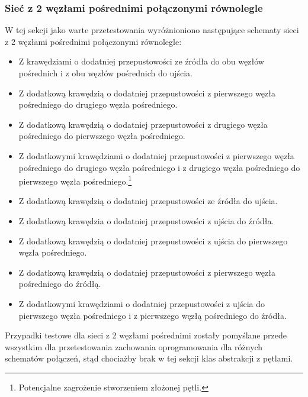 \subsubsection{Sieć z 2 węzłami pośrednimi połączonymi równolegle}
W tej sekcji jako warte przetestowania wyróżnioniono następujące schematy sieci
z 2 węzłami pośrednimi połączonymi równolegle:
\begin{itemize}[nosep]
    \item Z krawędziami o dodatniej przepustowości ze źródła do obu węzłów
    pośrednich i z obu węzłów pośrednich do ujścia.
    \item Z dodatkową krawędzią o dodatniej przepustowości z pierwszego węzła
    pośredniego do drugiego węzła pośredniego.
    \item Z dodatkową krawędzią o dodatniej przepustowości z drugiego węzła
    pośredniego do pierwszego węzła pośredniego.
    \item Z dodatkowymi krawędziami o dodatniej przepustowości z pierwszego
    węzła pośredniego do drugiego węzła pośredniego i z drugiego węzła
    pośredniego do pierwszego węzła pośredniego.\footnote{Potencjalne zagrożenie
    stworzeniem złożonej pętli.}
    \item Z dodatkową krawędzią o dodatniej przepustowości ze źródła do ujścia.
    \item Z dodatkową krawędzia o dodatniej przepustowości z ujścia do źródła.
    \item Z dodatkową krawędzią o dodatniej przepustowości z ujścia do
    pierwszego węzła pośredniego.
    \item Z dodatkową krawędzią o dodatniej przepustowości z pierwszego węzła
    pośredniego do źródłą.
    \item Z dodatkowymi krawędziami o dodatniej przepustowości z ujścia do
    pierwszego węzła pośredniego i z pierwszego węzłą pośredniego do źródła.
\end{itemize}
Przypadki testowe dla sieci z 2 węzłami pośrednimi zostały pomyślane przede
wszystkim dla przetestowania zachowania oprogramowania dla różnych schematów
połączeń, stąd chociażby brak w tej sekcji klas abstrakcji z pętlami.

